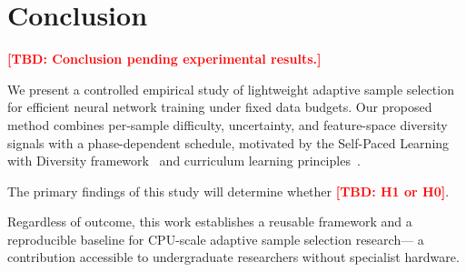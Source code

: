 \documentclass[10pt,twocolumn]{article}
\newcommand{\tbd}[1]{\textcolor{red}{\textbf{[TBD: #1]}}}
\begin{document}
\section{Conclusion}
\label{sec:conclusion}

\tbd{Conclusion pending experimental results.}

We present a controlled empirical study of lightweight adaptive sample selection
for efficient neural network training under fixed data budgets.
Our proposed method combines per-sample difficulty, uncertainty, and feature-space
diversity signals with a phase-dependent schedule, motivated by the Self-Paced
Learning with Diversity framework~\citep{jiang2014spld} and curriculum learning
principles~\citep{bengio2009curriculum}.

The primary findings of this study will determine whether \tbd{H1 or H0}.

Regardless of outcome, this work establishes a reusable framework and a
reproducible baseline for CPU-scale adaptive sample selection research---
a contribution accessible to undergraduate researchers without specialist hardware.



\end{document}
